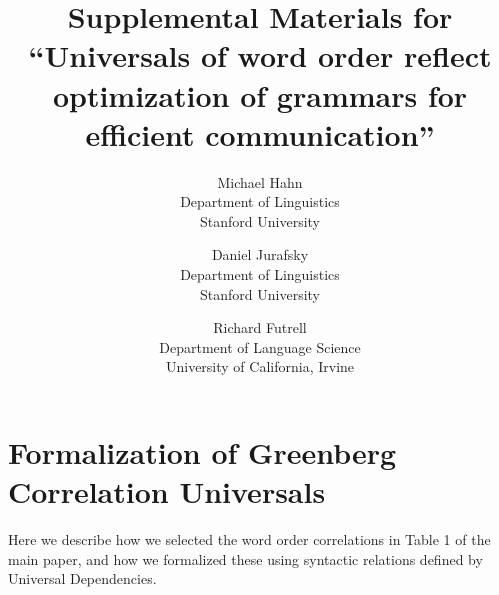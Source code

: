\documentclass[10pt,twoside,lineno]{article}
\title{Supplemental Materials for ``Universals of word order reflect optimization of grammars for efficient communication''}
\author{
        Michael Hahn \\
                Department of Linguistics\\
       Stanford University
            \and
       Daniel Jurafsky\\
       Department of Linguistics\\
       Stanford University \\
       \and
       Richard Futrell\\
       Department of Language Science\\
       University of California, Irvine
}
\begin{document}
\maketitle




\tableofcontents











\section{Formalization of Greenberg Correlation Universals}\label{sec:correlations}


Here we describe how we selected the word order correlations in Table 1 of the main paper, and how we formalized these using syntactic relations defined by Universal Dependencies.
\end{document}
